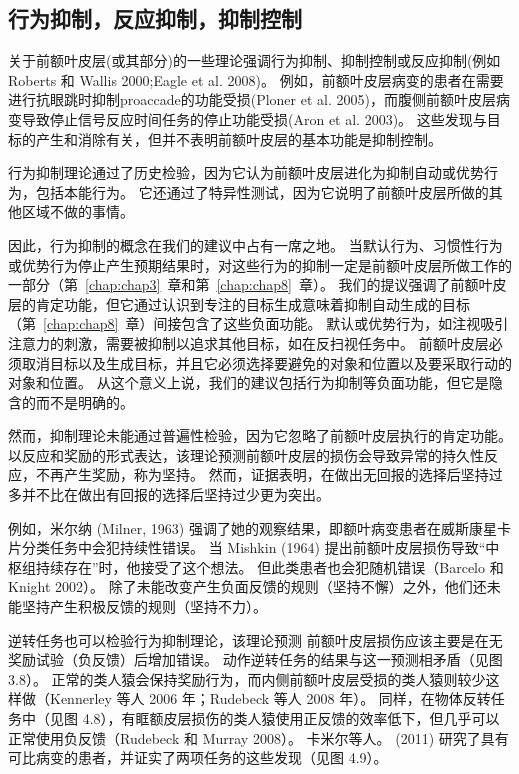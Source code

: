 \subsection{行为抑制，反应抑制，抑制控制}

关于前额叶皮层(或其部分)的一些理论强调行为抑制、抑制控制或反应抑制(例如Roberts 和 Wallis 2000;Eagle et al. 2008)。
例如，前额叶皮层病变的患者在需要进行抗眼跳时抑制proaccade的功能受损(Ploner et al. 2005)，而腹侧前额叶皮层病变导致停止信号反应时间任务的停止功能受损(Aron et al. 2003)。
这些发现与目标的产生和消除有关，但并不表明前额叶皮层的基本功能是抑制控制。
\par


行为抑制理论通过了历史检验，因为它认为前额叶皮层进化为抑制自动或优势行为，包括本能行为。
它还通过了特异性测试，因为它说明了前额叶皮层所做的其他区域不做的事情。
\par


因此，行为抑制的概念在我们的建议中占有一席之地。 
当默认行为、习惯性行为或优势行为停止产生预期结果时，对这些行为的抑制一定是前额叶皮层所做工作的一部分（第~\ref{chap:chap3}~章和第~\ref{chap:chap8}~章）。
我们的提议强调了前额叶皮层的肯定功能，但它通过认识到专注的目标生成意味着抑制自动生成的目标（第~\ref{chap:chap8}~章）间接包含了这些负面功能。 
默认或优势行为，如注视吸引注意力的刺激，需要被抑制以追求其他目标，如在反扫视任务中。
前额叶皮层必须取消目标以及生成目标，并且它必须选择要避免的对象和位置以及要采取行动的对象和位置。
从这个意义上说，我们的建议包括行为抑制等负面功能，但它是隐含的而不是明确的。
\par


然而，抑制理论未能通过普遍性检验，因为它忽略了前额叶皮层执行的肯定功能。
以反应和奖励的形式表达，该理论预测前额叶皮层的损伤会导致异常的持久性反应，不再产生奖励，称为坚持。 
然而，证据表明，在做出无回报的选择后坚持过多并不比在做出有回报的选择后坚持过少更为突出。
\par


例如，米尔纳 (Milner, 1963) 强调了她的观察结果，即额叶病变患者在威斯康星卡片分类任务中会犯持续性错误。
当 Mishkin (1964) 提出前额叶皮层损伤导致“中枢组持续存在”时，他接受了这个想法。
但此类患者也会犯随机错误（Barcelo 和 Knight 2002）。
除了未能改变产生负面反馈的规则（坚持不懈）之外，他们还未能坚持产生积极反馈的规则（坚持不力）。
\par


逆转任务也可以检验行为抑制理论，该理论预测 前额叶皮层损伤应该主要是在无奖励试验（负反馈）后增加错误。
动作逆转任务的结果与这一预测相矛盾（见图3.8）。
正常的类人猿会保持奖励行为，而内侧前额叶皮层受损的类人猿则较少这样做（Kennerley 等人 2006 年；Rudebeck 等人 2008 年）。
同样，在物体反转任务中（见图 4.8），有眶额皮层损伤的类人猿使用正反馈的效率低下，但几乎可以正常使用负反馈（Rudebeck 和 Murray 2008）。 卡米尔等人。
 (2011) 研究了具有可比病变的患者，并证实了两项任务的这些发现（见图 4.9）。
\par


